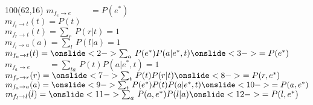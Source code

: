 \documentclass[shownotes,aspectratio=169]{beamer}
\begin{document}
\begin{frame}[plain]
\begin{textblock}{100}(62,16)
 $m_{f_e\rightarrow e}\phantom{(e)} = P(e^*) $  \\
 $m_{f_t\rightarrow t}(t) = P(t)$  \\
 $m_{f_r\rightarrow t}(t) = \sum_r \, P(r|t) = 1$  \\
 $m_{f_l\rightarrow a}(a) = \sum_l \, P(l|a) = 1 $  \\
 $m_{f_a\rightarrow t}(t) = \onslide<2->{\sum_{a} \, P(e^*) P(a|e^*,t)} \onslide<3->{= P(e^*)}$  \\
 $m_{f_a\rightarrow e}\phantom{(e)} = \sum_{ta} \, P(t) P(a|e^*,t) = 1$  \\
 $m_{f_r\rightarrow r}(r) = \onslide<7->{\sum_{t} \, P(t) P(r|t)} \onslide<8->{= P(r,e^*)}$ \\
 $m_{f_a\rightarrow a}(a) = \onslide<9->{\sum_{t} \, P(e^*)P(t)P(a|e^*,t)}\onslide<10->{  = P(a,e^*)}$  \\
 $m_{f_l\rightarrow l}(l) = \onslide<11->{\sum_{a} \, P(a,e^*) P(l|a)} \onslide<12->{ = P(l,e^*)}$
 \end{textblock}





\end{frame}
\end{document}
